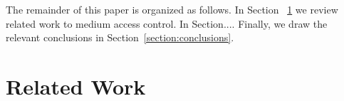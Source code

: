 \documentclass{sigcomm-alternate}
\begin{document}


The remainder of this paper is organized as follows. In Section ~\ref{section:relatedwork} we review related work to medium access control. In Section....
Finally, we draw the relevant conclusions in Section~\ref{section:conclusions}. 

\section{Related Work}
\label{section:relatedwork}

\end{document}
